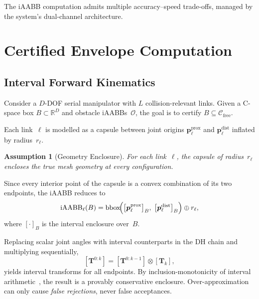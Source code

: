 \documentclass[journal]{IEEEtran}
\newtheorem{assumption}{Assumption}
\newcommand{\Cfree}{\mathcal{C}_\text{free}}
\newcommand{\iAABB}{\text{iAABB}}
\newcommand{\Real}{\mathbb{R}}
\newcommand{\calO}{\mathcal{O}}
\newcommand{\bT}{\mathbf{T}}
\begin{document}
The iAABB computation admits multiple accuracy--speed trade-offs,
managed by the system's dual-channel architecture.

\section{Certified Envelope Computation}\label{sec:envelope}

\subsection{Interval Forward Kinematics}\label{sec:ifk}

Consider a $D$-DOF serial manipulator with $L$ collision-relevant links.
Given a C-space box $B \subset \Real^D$ and obstacle iAABBs~$\calO$,
the goal is to certify $B \subseteq \Cfree$.

Each link~$\ell$ is modelled as a capsule between joint origins
$\bm{p}_\ell^{\mathrm{prox}}$ and $\bm{p}_\ell^{\mathrm{dist}}$
inflated by radius~$r_\ell$.

\begin{assumption}[Geometry Enclosure]\label{asm:geom}
For each link~$\ell$, the capsule of radius~$r_\ell$ encloses the
true mesh geometry at every configuration.
\end{assumption}

Since every interior point of the capsule is a convex combination of
its two endpoints, the iAABB reduces to
\begin{equation}\label{eq:endpoint_iaabb}
  \iAABB_\ell(B)
  = \mathrm{bbox}\!\Bigl(
      \bigl[\bm{p}_\ell^{\mathrm{prox}}\bigr]_B,\;
      \bigl[\bm{p}_\ell^{\mathrm{dist}}\bigr]_B
    \Bigr) \oplus r_\ell,
\end{equation}
where $[\cdot]_B$ is the interval enclosure over~$B$.

Replacing scalar joint angles with interval counterparts in the DH
chain and multiplying sequentially,
\begin{equation}\label{eq:chain}
  [\bT^{0:k}] = [\bT^{0:k-1}] \otimes [\bT_k],
\end{equation}
yields interval transforms for all endpoints.
By inclusion-monotonicity of interval
arithmetic~\cite{moore2009introduction}, the result is a
provably conservative enclosure.
Over-approximation can only cause \emph{false rejections}, never
false acceptances.
\end{document}
